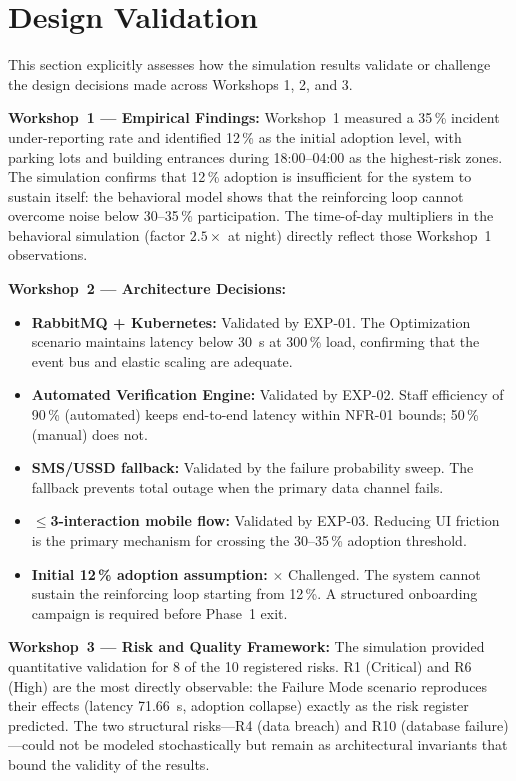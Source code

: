 \documentclass[conference,a4paper,10pt]{IEEEtran}
\begin{document}
\section{Design Validation}

This section explicitly assesses how the simulation results validate
or challenge the design decisions made across Workshops 1, 2, and 3.

\textbf{Workshop~1 --- Empirical Findings:}
Workshop~1 measured a 35\,\% incident under-reporting rate and
identified 12\,\% as the initial adoption level, with parking lots
and building entrances during 18:00--04:00 as the highest-risk zones.
The simulation confirms that 12\,\% adoption is insufficient for the
system to sustain itself: the behavioral model shows that the
reinforcing loop cannot overcome noise below 30--35\,\% participation.
The time-of-day multipliers in the behavioral simulation (factor
$2.5\times$ at night) directly reflect those Workshop~1 observations.

\textbf{Workshop~2 --- Architecture Decisions:}

\begin{itemize}
  \item \textbf{RabbitMQ + Kubernetes:} \checkmark Validated by EXP-01.
    The Optimization scenario maintains latency below 30~s at 300\,\%
    load, confirming that the event bus and elastic scaling are adequate.
  \item \textbf{Automated Verification Engine:} \checkmark Validated by
    EXP-02. Staff efficiency of 90\,\% (automated) keeps end-to-end
    latency within NFR-01 bounds; 50\,\% (manual) does not.
  \item \textbf{SMS/USSD fallback:} \checkmark Validated by the failure
    probability sweep. The fallback prevents total outage when the
    primary data channel fails.
  \item \textbf{$\leq$3-interaction mobile flow:} \checkmark Validated
    by EXP-03. Reducing UI friction is the primary mechanism for
    crossing the 30--35\,\% adoption threshold.
  \item \textbf{Initial 12\,\% adoption assumption:} $\times$ Challenged.
    The system cannot sustain the reinforcing loop starting from 12\,\%.
    A structured onboarding campaign is required before Phase~1 exit.
\end{itemize}

\textbf{Workshop~3 --- Risk and Quality Framework:}
The simulation provided quantitative validation for 8 of the 10
registered risks. R1 (Critical) and R6 (High) are the most directly
observable: the Failure Mode scenario reproduces their effects
(latency 71.66~s, adoption collapse) exactly as the risk register
predicted. The two structural risks---R4 (data breach) and R10
(database failure)---could not be modeled stochastically but remain
as architectural invariants that bound the validity of the results.
\end{document}
